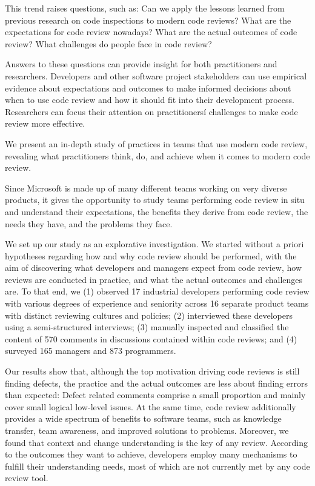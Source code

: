 \documentclass[conference]{IEEEtran}
\begin{document}
This trend raises questions, such as: Can we apply the lessons learned from
previous research on code inspections to modern code reviews? What are the
expectations for code review nowadays? What are the actual outcomes of code
review? What challenges do people face in code review?

Answers to these questions can provide insight for both practitioners and
researchers.  Developers and other software project stakeholders can use
empirical evidence about expectations and outcomes to make informed decisions
about when to use code review and how it should fit into their development
process. Researchers can focus their attention on practitionersí challenges to
make code review more effective.

We present an in-depth study of practices in teams that use modern code review,
revealing what practitioners think, do, and achieve when it comes to modern
code review.

Since Microsoft is made up of many different teams working on very diverse
products, it gives the opportunity to study teams performing code review in
situ and understand their expectations, the benefits they derive from code
review, the needs they have, and the problems they face.

We set up our study as an explorative investigation. We started without a
priori hypotheses regarding how and why code review should be performed, with
the aim of discovering what developers and managers expect from code review,
how reviews are conducted in practice, and what the actual outcomes and
challenges are. To that end, we (1) observed 17 industrial developers
performing code review with various degrees of experience and seniority across
16 separate product teams with distinct reviewing cultures and policies; (2)
interviewed these developers using a semi-structured interviews; (3) manually
inspected and classified the content of 570 comments in discussions contained
within code reviews; and (4) surveyed 165 managers and 873 programmers.

Our results show that, although the top motivation driving code reviews is
still finding defects, the practice and the actual outcomes are less about
finding errors than expected: Defect related comments comprise a small
proportion and mainly cover small logical low-level issues. At the same time,
code review additionally provides a wide spectrum of benefits to software
teams, such as knowledge transfer, team awareness, and improved solutions to
problems. Moreover, we found that context and change understanding is the key
of any review. According to the outcomes they want to achieve, developers
employ many mechanisms to fulfill their understanding needs, most of which are
not currently met by any code review tool.
\end{document}
